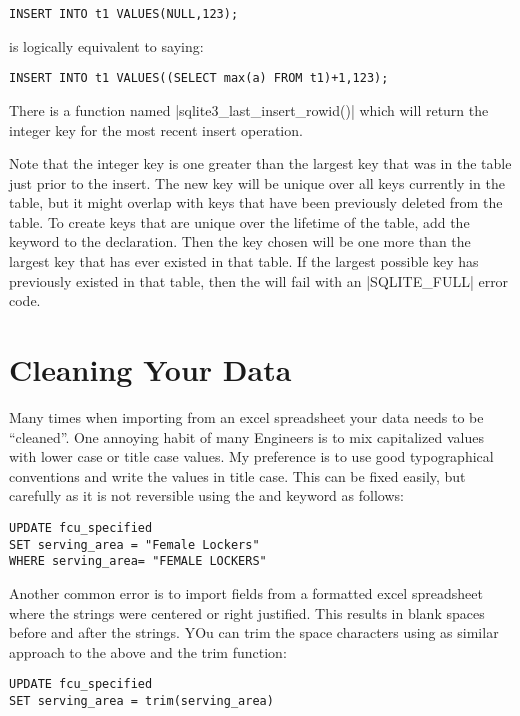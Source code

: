 \begin{verbatim}
INSERT INTO t1 VALUES(NULL,123);
\end{verbatim}

is logically equivalent to saying:

\begin{verbatim}
INSERT INTO t1 VALUES((SELECT max(a) FROM t1)+1,123);
\end{verbatim}


There is a function named |sqlite3_last_insert_rowid()| which will return the integer key for the most recent insert operation.

Note that the integer key is one greater than the largest key that was in the table just prior to the insert. The new key will be unique over all keys currently in the table, but it might overlap with keys that have been previously deleted from the table. To create keys that are unique over the lifetime of the table, add the  keyword to the  declaration. Then the key chosen will be one more than the largest key that has ever existed in that table. If the largest possible key has previously existed in that table, then the  will fail with an |SQLITE_FULL| error code.

\section{Cleaning Your Data}

Many times when importing from an excel spreadsheet your data needs to be \enquote{cleaned}. One annoying habit of many Engineers is to mix capitalized values with lower case or title case values. My preference is to use good typographical conventions and write the values in title case. This can be fixed easily, but carefully as it is not reversible using the  and  keyword as follows:

\begin{verbatim}
UPDATE fcu_specified 
SET serving_area = "Female Lockers" 
WHERE serving_area= "FEMALE LOCKERS"
\end{verbatim}

Another common error is to import fields from a formatted excel spreadsheet where the strings were centered or right justified. This results in blank spaces before and after the strings. YOu can trim the space characters using as similar approach to the above and the trim function:

\begin{verbatim}
UPDATE fcu_specified 
SET serving_area = trim(serving_area) 
\end{verbatim}







